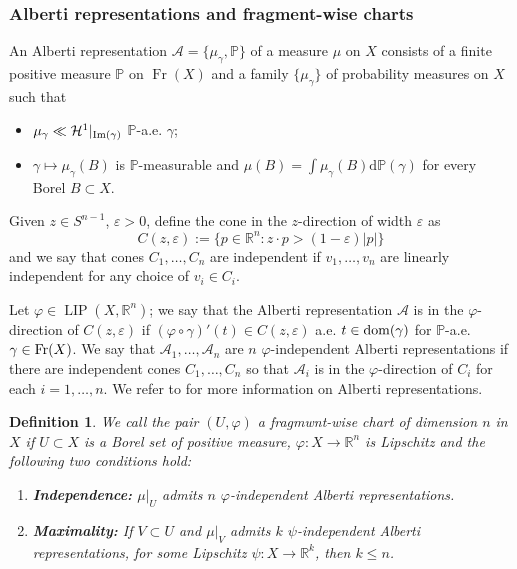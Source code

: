 \documentclass{amsart}
\newtheorem{definition}[theorem]{Definition}
\numberwithin{equation}{section}
\newcommand{\R}{\mathbb{R}}
\newcommand{\LIP}{\operatorname{LIP}}
\newcommand{\Fr}{\operatorname{Fr}}
\newcommand{\ud}{\mathrm {d}}
\begin{document}
\subsubsection*{Alberti representations and fragment-wise charts}  An Alberti representation $\mathcal A=\{\mu_\gamma,\mathbb P\}$ of a measure $\mu$ on $X$ consists of a finite positive measure $\mathbb P$ on $\Fr (X)$ and a family $\{\mu_\gamma\}$ of probability measures on $X$ such that
\begin{itemize}
	\item[(a)] $\mu_\gamma\ll\mathcal H^1|_{{\rm Im}(\gamma)}$ $\mathbb P$-a.e. $\gamma$;
	\item[(b)] $\gamma\mapsto \mu_\gamma(B)$ is $\mathbb P$-measurable and $\displaystyle \mu(B)=\int\mu_\gamma(B)\ud \mathbb P(\gamma)$ for every Borel $B\subset X$.
\end{itemize}

Given $z\in S^{n-1}$, $\varepsilon>0$, define the cone in the $z$-direction of width $\varepsilon$ as
$$C(z,\varepsilon):=\{p\in \R^n: z\cdot p> (1-\varepsilon)|p| \}$$
and we say that cones $C_1,\dots ,C_n$ are independent if $v_1,\dots ,v_n$ are linearly independent for any choice of $v_i\in C_i$.

Let  $\varphi\in \LIP(X,\R^n)$; we say that the Alberti representation $\mathcal A$ is in the $\varphi$-direction of $C(z,\varepsilon)$ if $(\varphi\circ\gamma)'(t)\in C(z,\varepsilon)$ a.e. $t\in {\rm dom}(\gamma)$ for $\mathbb P$-a.e. $\gamma\in {\rm Fr}(X)$.
We say that $\mathcal A_1,\dots ,\mathcal A_n$ are $n$ $\varphi$-independent Alberti representations if there are independent cones $C_1,\dots ,C_n$ so that $\mathcal A_i$ is in the $\varphi$-direction of $C_i$ for each $i=1,\dots ,n$.
  We refer to \cite{bate2013differentiability,sch16b}  for more information on Alberti representations.
  

\begin{definition}\label{def:fwchart}
We call the pair $(U,\varphi )$ a fragmwnt-wise chart of dimension $n$ in $X$ if $U\subset X$ is a Borel set of positive measure, $\varphi :X\rightarrow \R^n$ is Lipschitz and the following two conditions hold:
\begin{enumerate}
    \item[$(i)$] \textbf{\em Independence:} $\mu|_U$ admits $n$ $\varphi$-independent Alberti representations.
    \item[$(ii)$] \textbf{\em Maximality:} If $V\subset U$ and $\mu|_V$ admits $k$ $\psi$-independent Alberti representations, for some Lipschitz $\psi:X\to \R^k$, then $k\leq n$.
\end{enumerate}
\end{definition}
\end{document}
